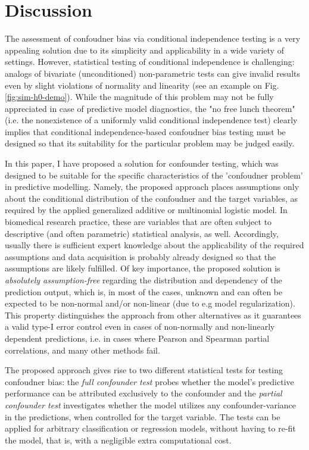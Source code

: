 \documentclass{article}
\begin{document}
\section{Discussion}

The assessment of confoudner bias via conditional independence testing is a very appealing solution due to its simplicity and applicability in a wide variety of settings. However, statistical testing of conditional independence is challenging: analogs of bivariate (unconditioned) non-parametric tests can give invalid results even by slight violations of normality and linearity\citep{korn1984ranges} (see an example on Fig. \ref{fig:sim-h0-demo}). While the magnitude of this problem may not be fully appreciated in case of predictive model diagnostics, the "no free lunch theorem" (i.e. the nonexistence of a uniformly valid conditional independence test)\cite{shah2020hardness} clearly implies that conditional independence-based confoudner bias testing must be designed so that its suitability for the particular problem may be judged easily.

In this paper, I have proposed a solution for confounder testing, which was designed to be suitable for the specific characteristics of the 'confoudner problem' in predictive modelling. Namely, the proposed approach places assumptions only about the conditional distribution of the confoudner and the target variables, as required by the applied generalized additive\cite{hastie1987generalized} or multinomial logistic model\cite{bennett1966multiple, jones1975proability}. In biomedical research practice, these are variables that are often subject to descriptive (and often parametric) statistical analysis, as well. Accordingly, usually there is sufficient expert knowledge about the applicability of the required assumptions and data acquisition is probably already designed so that the assumptions are likely fulfilled.
Of key importance, the proposed solution is \emph{absolutely assumption-free} regarding the distribution and dependency of the prediction output, which is, in most of the cases, unknown and can often be expected to be non-normal and/or non-linear (due to e.g model regularization)\citep{garcia2009study, kristensen2017whole}. 
This property distinguishes the approach from other alternatives as it guarantees a valid type-I error control even in cases of non-normally and non-linearly dependent predictions, i.e. in cases where Pearson and Spearman partial correlations, and many other methods fail.

The proposed approach gives rise to two different statistical tests for testing confoudner bias: the \emph{full confounder test} probes whether the model's predictive performance can be attributed exclusively to the confounder and the \emph{partial confounder test} investigates whether the model utilizes any confounder-variance in the predictions, when controlled for the target variable. 
The tests can be applied for arbitrary classification or regression models, without having to re-fit the model, that is, with a negligible extra computational cost.
\end{document}
